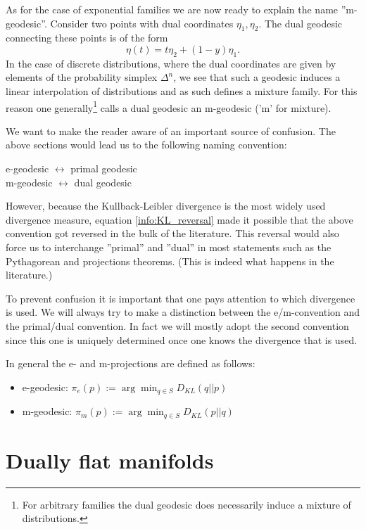     As for the case of exponential families we are now ready to explain the name ''m-geodesic''. Consider two points with dual coordinates $\eta_1,\eta_2$. The dual geodesic connecting these points is of the form \[\eta(t) = t\eta_2 + (1-y)\eta_1.\] In the case of discrete distributions, where the dual coordinates are given by elements of the probability simplex $\Delta^n$, we see that such a geodesic induces a linear interpolation of distributions and as such defines a mixture family. For this reason one generally\footnote{For arbitrary families the dual geodesic does necessarily induce a mixture of distributions.} calls a dual geodesic an m-geodesic ('m' for mixture).

    \begin{remark}
        We want to make the reader aware of an important source of confusion. The above sections would lead us to the following naming convention:
        \begin{center}
            e-geodesic $\leftrightarrow$ primal geodesic\\
            m-geodesic $\leftrightarrow$ dual geodesic
        \end{center}
        However, because the Kullback-Leibler divergence is the most widely used divergence measure, equation \ref{info:KL_reversal} made it possible that the above convention got reversed in the bulk of the literature. This reversal would also force us to interchange ''primal'' and ''dual'' in most statements such as the Pythagorean and projections theorems. (This is indeed what happens in the literature.)

        To prevent confusion it is important that one pays attention to which divergence is used. We will always try to make a distinction between the e/m-convention and the primal/dual convention. In fact we will mostly adopt the second convention since this one is uniquely determined once one knows the divergence that is used.

        In general the e- and m-projections are defined as follows:
        \begin{itemize}
            \item e-geodesic: $\pi_e(p) := \arg\min_{q\in S} D_{KL}(q||p)$
            \item m-geodesic: $\pi_m(p) := \arg\min_{q\in S} D_{KL}(p||q)$
        \end{itemize}
    \end{remark}

\section{Dually flat manifolds}
